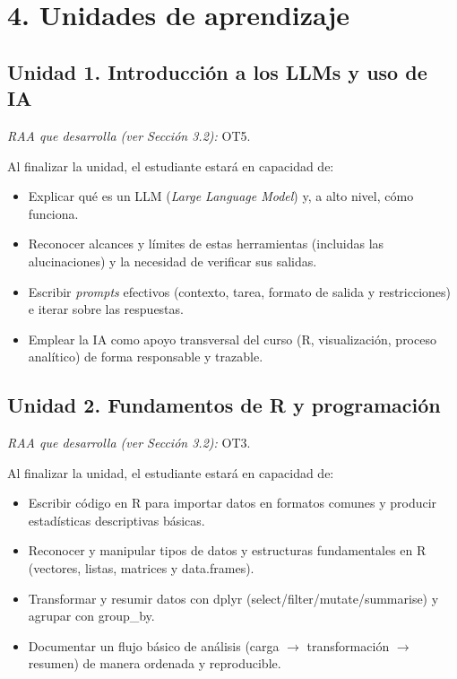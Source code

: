 \documentclass[11pt,a4paper]{article}
\begin{document}
\section*{4. Unidades de aprendizaje}

\subsection*{Unidad 1. Introducción a los LLMs y uso de IA}

\textit{RAA que desarrolla (ver Sección 3.2):} OT5.

Al finalizar la unidad, el estudiante estará en capacidad de:

\begin{itemize}
    \item Explicar qué es un LLM (\textit{Large Language Model}) y, a alto nivel, cómo funciona.
    \item Reconocer alcances y límites de estas herramientas (incluidas las alucinaciones) y la necesidad de verificar sus salidas.
    \item Escribir \textit{prompts} efectivos (contexto, tarea, formato de salida y restricciones) e iterar sobre las respuestas.
    \item Emplear la IA como apoyo transversal del curso (R, visualización, proceso analítico) de forma responsable y trazable.
\end{itemize}

\subsection*{Unidad 2. Fundamentos de R y programación}

\textit{RAA que desarrolla (ver Sección 3.2):} OT3.

Al finalizar la unidad, el estudiante estará en capacidad de:

\begin{itemize}
    \item Escribir código en R para importar datos en formatos comunes y producir estadísticas descriptivas básicas.
    \item Reconocer y manipular tipos de datos y estructuras fundamentales en R (vectores, listas, matrices y data.frames).
    \item Transformar y resumir datos con dplyr (select/filter/mutate/summarise) y agrupar con group\_by.
    \item Documentar un flujo básico de análisis (carga $\rightarrow$ transformación $\rightarrow$ resumen) de manera ordenada y reproducible.
\end{itemize}
\end{document}
